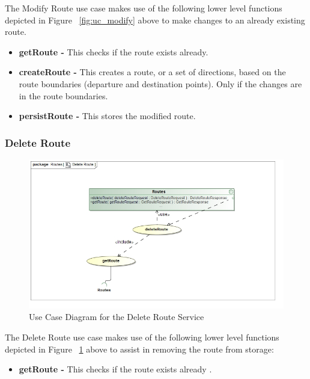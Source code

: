 \documentclass[a4paper,12pt]{article}
\begin{document}
The Modify Route use case makes use of the following lower level functions depicted in Figure ~\ref{fig:uc_modify} above to make changes to an already existing route.
\begin{itemize}
\item \textbf{getRoute -} This checks if the route exists already.
\item \textbf{createRoute -} This creates a route, or a set of directions, based on the route boundaries (departure and destination points). Only if the changes are in the route boundaries.
\item \textbf{persistRoute -} This stores the modified route.
\end{itemize}

\subsubsection{Delete Route}

\begin{figure}[here]
\includegraphics[width=\textwidth]{images/Delete_Route.jpg}
\caption{Use Case Diagram for the Delete Route Service}
\label{fig:uc_delete}
\end{figure}

The Delete Route use case makes use of the following lower level functions depicted in Figure ~\ref{fig:uc_delete} above to assist in removing the route from storage:
\begin{itemize}
\item \textbf{getRoute -} This checks if the route exists already .
\end{itemize}
\end{document}
